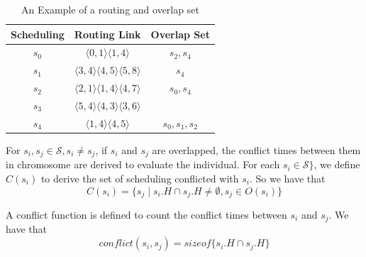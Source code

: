 \documentclass[journal]{IEEEtran}
\newcommand{\calS}{\mathcal{S}}
\theoremstyle{remark}
\begin{document}
\begin{table}[!t]
	\renewcommand{\arraystretch}{1.3}
	\caption{An Example of a routing and overlap set}
	\label{t:overlap}
	\centering
	\begin{tabular}{|c||c||c|}
		\hline
		\textbf{Scheduling} & \textbf{Routing Link}& \textbf{Overlap Set}\\
		\hline
		$s_{0}$ & $ \langle 0,1\rangle\langle 1,4\rangle$ 		& $s_{2},s_{4}$ \\
		\hline
		$s_{1}$ & $ \langle 3,4\rangle\langle 4,5\rangle\langle 5,8\rangle$	& $s_{4}$ \\
		\hline
		$s_{2}$ & $ \langle 2,1\rangle\langle 1,4\rangle\langle 4,7\rangle$ 	& $s_{0},s_{4}$ \\
		\hline		
		$s_{3}$ & $ \langle 5,4\rangle\langle 4,3\rangle\langle 3,6\rangle$ 	& \\
		\hline
		$s_{4}$ & $ \langle 1,4\rangle\langle 4,5\rangle$ 		& $s_{0},s_{1},s_{2}$ \\
		\hline		
	\end{tabular}
\end{table}

For $s_{i},s_{j}\in \calS, s_{i}\neq s_{j}$,
if $s_i$ and $s_j$ are overlapped,
the conflict times between them in chromosome are derived to evaluate the individual.
For each $s_{i}\in \calS\}$,
 we define $C(s_{i})$ to derive the set of scheduling conflicted with $s_{i}$. So we have that
\begin{equation}
	C(s_i) = \{ s_j \mid s_i.H \cap s_j.H \neq \emptyset  ,s_j\in O(s_i) \}
\end{equation}
   
A conflict function is defined to count the conflict times between $s_i$ and $s_j$.
We have that
\begin{equation}
	conflict(s_i,s_j) = sizeof \{s_i.H \cap s_j.H\}
\end{equation}
\end{document}
